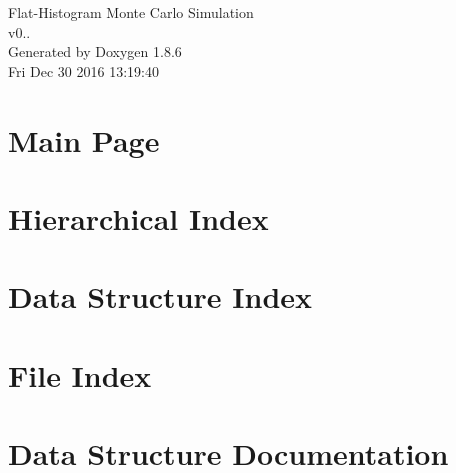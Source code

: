 \documentclass[twoside]{book}
\newcommand{\clearemptydoublepage}{%
  \newpage{\pagestyle{empty}\cleardoublepage}%
}
\begin{document}
\hypersetup{pageanchor=false}
\begin{titlepage}
\vspace*{7cm}
\begin{center}%
{\Large Flat-\/\-Histogram Monte Carlo Simulation \\[1ex]\large v0.. }\\
\vspace*{1cm}
{\large Generated by Doxygen 1.8.6}\\
\vspace*{0.5cm}
{\small Fri Dec 30 2016 13:19:40}\\
\end{center}
\end{titlepage}
\clearemptydoublepage
\tableofcontents
\clearemptydoublepage
{}
\hypersetup{pageanchor=true}

\chapter{Main Page}
\label{index}\hypertarget{index}{}
\chapter{Hierarchical Index}

\chapter{Data Structure Index}

\chapter{File Index}

\chapter{Data Structure Documentation}































\end{document}
